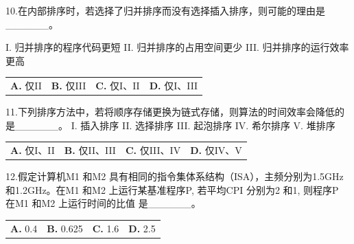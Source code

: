 \documentclass[UTF8,11pt]{ctexart}
\begin{document}
10.在内部排序时，若选择了归并排序而没有选择插入排序，则可能的理由是\_\_\_\_\_\_。


I. 归并排序的程序代码更短 II. 归并排序的占用空间更少 III. 归并排序的运行效率更高


\begin{center}\begin{tabular}{>{\raggedright\arraybackslash}p{\dimexpr(\linewidth-8\tabcolsep)/4\relax}>{\raggedright\arraybackslash}p{\dimexpr(\linewidth-8\tabcolsep)/4\relax}>{\raggedright\arraybackslash}p{\dimexpr(\linewidth-8\tabcolsep)/4\relax}>{\raggedright\arraybackslash}p{\dimexpr(\linewidth-8\tabcolsep)/4\relax}}
\textbf{A.} 仅II & \textbf{B.} 仅III & \textbf{C.} 仅I、II & \textbf{D.} 仅I、III\\[.35em]\end{tabular}\end{center}

11.下列排序方法中，若将顺序存储更换为链式存储，则算法的时间效率会降低的是\_\_\_\_\_\_。 I. 插入排序 II. 选择排序 III. 起泡排序 IV. 希尔排序 V. 堆排序


\begin{center}\begin{tabular}{>{\raggedright\arraybackslash}p{\dimexpr(\linewidth-8\tabcolsep)/4\relax}>{\raggedright\arraybackslash}p{\dimexpr(\linewidth-8\tabcolsep)/4\relax}>{\raggedright\arraybackslash}p{\dimexpr(\linewidth-8\tabcolsep)/4\relax}>{\raggedright\arraybackslash}p{\dimexpr(\linewidth-8\tabcolsep)/4\relax}}
\textbf{A.} 仅I、II & \textbf{B.} 仅II、III & \textbf{C.} 仅III、IV & \textbf{D.} 仅IV、V\\[.35em]\end{tabular}\end{center}

12.假定计算机M1 和M2 具有相同的指令集体系结构（ISA），主频分别为1.5GHz 和1.2GHz。在M1 和M2 上运行某基准程序P, 若平均CPI 分别为2 和1, 则程序P 在M1 和M2 上运行时间的比值 是\_\_\_\_\_\_。


\begin{center}\begin{tabular}{>{\raggedright\arraybackslash}p{\dimexpr(\linewidth-8\tabcolsep)/4\relax}>{\raggedright\arraybackslash}p{\dimexpr(\linewidth-8\tabcolsep)/4\relax}>{\raggedright\arraybackslash}p{\dimexpr(\linewidth-8\tabcolsep)/4\relax}>{\raggedright\arraybackslash}p{\dimexpr(\linewidth-8\tabcolsep)/4\relax}}
\textbf{A.} 0.\allowbreak{}4 & \textbf{B.} 0.\allowbreak{}625 & \textbf{C.} 1.\allowbreak{}6 & \textbf{D.} 2.\allowbreak{}5\\[.35em]\end{tabular}\end{center}
\end{document}
